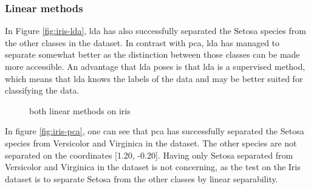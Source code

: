 \subsubsection{Linear methods}\label{subsubsec:linear-methods-on-iris}
In Figure \ref{fig:iris-lda}, \gls{lda} has also successfully separated the Setosa species from the other classes in the dataset. In contrast with \gls{pca}, \gls{lda} has managed to separate somewhat better as the distinction between those classes can be made more accessible. An advantage that \gls{lda} poses is that \gls{lda} is a supervised method, which means that  \gls{lda} knows the labels of the data and may be better suited for classifying the data.


\begin{figure}[htb!]
    \centering
    \qquad
    \caption{both linear methods on iris}
    \label{fig:linear-methods-iris}
\end{figure}


In figure \ref{fig:iris-pca}, one can see that \gls{pca} has successfully separated the Setosa species from Versicolor and Virginica in the dataset. The other species are not separated on the coordinates [1.20, -0.20]. Having only Setosa separated from Versicolor and Virginica in the dataset is not concerning, as the test on the Iris dataset is to separate Setosa from the other classes by linear separability.


